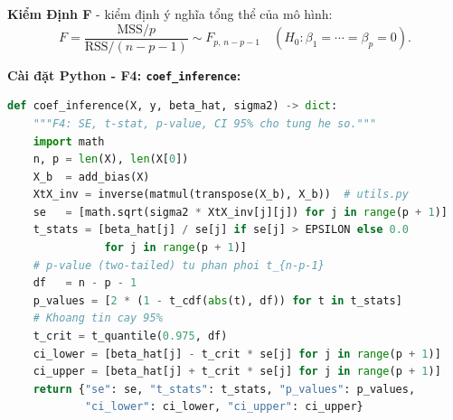 \medskip
\noindent\textbf{Kiểm Định F} - kiểm định ý nghĩa tổng thể của mô hình:
\begin{equation}
    F = \frac{\mathrm{MSS}/p}{\mathrm{RSS}/(n-p-1)}
      \sim F_{p,\, n-p-1}
    \quad (H_0 : \beta_1 = \cdots = \beta_p = 0).
    \label{eq:f_test}
\end{equation}

\textbf{Cài đặt Python - F4: \texttt{coef\_inference}:}

\begin{lstlisting}[language=Python, caption={Hàm \texttt{coef\_inference} - tính standard error, t-statistic, p-value và khoảng tin cậy 95\%}]
def coef_inference(X, y, beta_hat, sigma2) -> dict:
    """F4: SE, t-stat, p-value, CI 95% cho tung he so."""
    import math
    n, p = len(X), len(X[0])
    X_b  = add_bias(X)
    XtX_inv = inverse(matmul(transpose(X_b), X_b))  # utils.py
    se   = [math.sqrt(sigma2 * XtX_inv[j][j]) for j in range(p + 1)]
    t_stats = [beta_hat[j] / se[j] if se[j] > EPSILON else 0.0
               for j in range(p + 1)]
    # p-value (two-tailed) tu phan phoi t_{n-p-1}
    df   = n - p - 1
    p_values = [2 * (1 - t_cdf(abs(t), df)) for t in t_stats]
    # Khoang tin cay 95%
    t_crit = t_quantile(0.975, df)
    ci_lower = [beta_hat[j] - t_crit * se[j] for j in range(p + 1)]
    ci_upper = [beta_hat[j] + t_crit * se[j] for j in range(p + 1)]
    return {"se": se, "t_stats": t_stats, "p_values": p_values,
            "ci_lower": ci_lower, "ci_upper": ci_upper}
\end{lstlisting}


